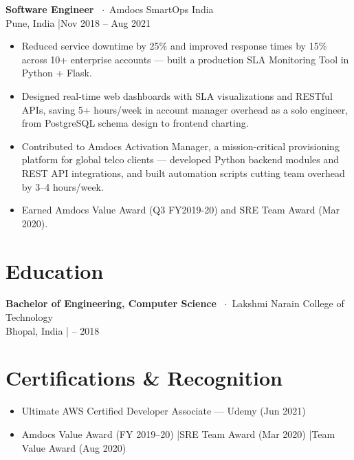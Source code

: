 \documentclass[10pt, letterpaper]{article}
\newcommand{\jobheader}[4]{%
  \vspace{2pt}%
  {\color{darktext}\textbf{#1}}%
  {\color{graytext}\ $\cdot$\ #2}\\[1pt]%
  {\small\color{graytext}#3 \quad|\quad #4}%
  \vspace{1pt}%
}
\begin{document}
\jobheader{Software Engineer}{Amdocs SmartOps India}{Pune, India}{Nov 2018 -- Aug 2021}
\begin{itemize}
  \item Reduced service downtime by 25\% and improved response times by 15\% across 10+
        enterprise accounts --- built a production SLA Monitoring Tool in Python + Flask.
  \item Designed real-time web dashboards with SLA visualizations and RESTful APIs, saving
        5+ hours/week in account manager overhead as a solo engineer, from PostgreSQL
        schema design to frontend charting.
  \item Contributed to Amdocs Activation Manager, a mission-critical provisioning platform
        for global telco clients --- developed Python backend modules and REST API
        integrations, and built automation scripts cutting team overhead by 3--4 hours/week.
  \item Earned Amdocs Value Award (Q3 FY2019-20) and SRE Team Award (Mar 2020).
\end{itemize}

\vspace{4pt}
\section{Education}

\jobheader{Bachelor of Engineering, Computer Science}{Lakshmi Narain College of Technology}{Bhopal, India}{2014 -- 2018}

\vspace{4pt}
\section{Certifications \& Recognition}

\begin{itemize}
  \item Ultimate AWS Certified Developer Associate --- Udemy (Jun 2021)
  \item Amdocs Value Award (FY 2019--20) \quad|\quad SRE Team Award (Mar 2020) \quad|\quad Team Value Award (Aug 2020)
\end{itemize}

\end{document}
